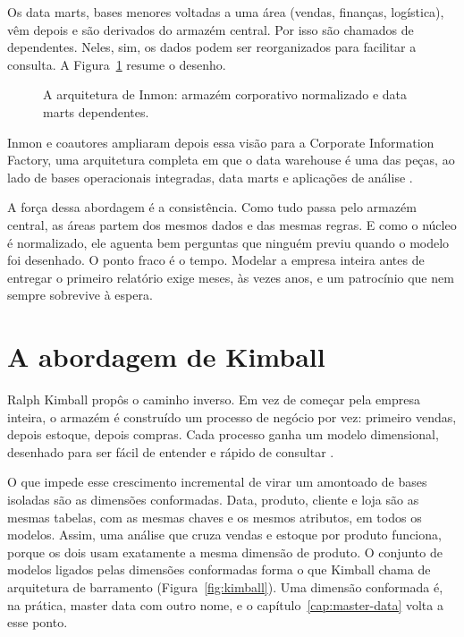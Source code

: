 Os data marts, bases menores voltadas a uma área (vendas, finanças, logística), vêm
depois e são derivados do armazém central. Por isso são chamados de dependentes. Neles,
sim, os dados podem ser reorganizados para facilitar a consulta. A
Figura~\ref{fig:inmon} resume o desenho.

\begin{figure}[htbp]
  \centering
  
  \caption{A arquitetura de Inmon: armazém corporativo normalizado e data marts dependentes.}
  \label{fig:inmon}
\end{figure}

Inmon e coautores ampliaram depois essa visão para a Corporate Information Factory, uma
arquitetura completa em que o data warehouse é uma das peças, ao lado de bases
operacionais integradas, data marts e aplicações de análise \parencite{inmon2001}.

A força dessa abordagem é a consistência. Como tudo passa pelo armazém central, as áreas
partem dos mesmos dados e das mesmas regras. E como o núcleo é normalizado, ele aguenta
bem perguntas que ninguém previu quando o modelo foi desenhado. O ponto fraco é o tempo.
Modelar a empresa inteira antes de entregar o primeiro relatório exige meses, às vezes
anos, e um patrocínio que nem sempre sobrevive à espera.

\section{A abordagem de Kimball}
\label{sec:kimball}

Ralph Kimball propôs o caminho inverso. Em vez de começar pela empresa inteira, o
armazém é construído um processo de negócio por vez: primeiro vendas, depois estoque,
depois compras. Cada processo ganha um modelo dimensional, desenhado para ser fácil de
entender e rápido de consultar \parencite{kimball1996,kimball2013}.

O que impede esse crescimento incremental de virar um amontoado de bases isoladas são as
dimensões conformadas. Data, produto, cliente e loja são as mesmas tabelas, com as mesmas
chaves e os mesmos atributos, em todos os modelos. Assim, uma análise que cruza vendas e
estoque por produto funciona, porque os dois usam exatamente a mesma dimensão de produto.
O conjunto de modelos ligados pelas dimensões conformadas forma o que Kimball chama de
arquitetura de barramento (Figura~\ref{fig:kimball}). Uma dimensão conformada é, na
prática, master data com outro nome, e o capítulo~\ref{cap:master-data} volta a esse
ponto.

